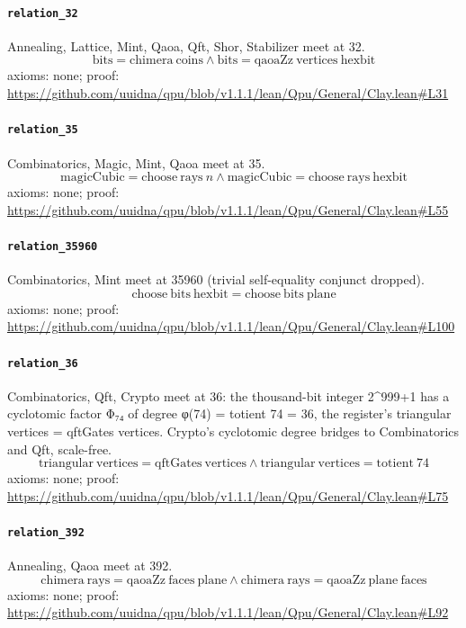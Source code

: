 \documentclass[11pt]{article}
\begin{document}
\paragraph{\texttt{relation\_32}}
Annealing, Lattice, Mint, Qaoa, Qft, Shor, Stabilizer meet at 32.
\[ \mathrm{bits} = \mathrm{chimera}\ \mathrm{coins} \land \mathrm{bits} = \mathrm{qaoaZz}\ \mathrm{vertices}\ \mathrm{hexbit} \]
\noindent axioms: none; proof: \url{https://github.com/uuidna/qpu/blob/v1.1.1/lean/Qpu/General/Clay.lean\#L31}

\paragraph{\texttt{relation\_35}}
Combinatorics, Magic, Mint, Qaoa meet at 35.
\[ \mathrm{magicCubic} = \mathrm{choose}\ \mathrm{rays}\ n \land \mathrm{magicCubic} = \mathrm{choose}\ \mathrm{rays}\ \mathrm{hexbit} \]
\noindent axioms: none; proof: \url{https://github.com/uuidna/qpu/blob/v1.1.1/lean/Qpu/General/Clay.lean\#L55}

\paragraph{\texttt{relation\_35960}}
Combinatorics, Mint meet at 35960 (trivial self-equality conjunct dropped).
\[ \mathrm{choose}\ \mathrm{bits}\ \mathrm{hexbit} = \mathrm{choose}\ \mathrm{bits}\ \mathrm{plane} \]
\noindent axioms: none; proof: \url{https://github.com/uuidna/qpu/blob/v1.1.1/lean/Qpu/General/Clay.lean\#L100}

\paragraph{\texttt{relation\_36}}
Combinatorics, Qft, Crypto meet at 36: the thousand-bit integer 2\^{}999+1 has a cyclotomic factor Φ₇₄ of degree φ(74) = totient 74 = 36, the register's triangular vertices = qftGates vertices. Crypto's cyclotomic degree bridges to Combinatorics and Qft, scale-free.
\[ \mathrm{triangular}\ \mathrm{vertices} = \mathrm{qftGates}\ \mathrm{vertices} \land \mathrm{triangular}\ \mathrm{vertices} = \mathrm{totient}\ 74 \]
\noindent axioms: none; proof: \url{https://github.com/uuidna/qpu/blob/v1.1.1/lean/Qpu/General/Clay.lean\#L75}

\paragraph{\texttt{relation\_392}}
Annealing, Qaoa meet at 392.
\[ \mathrm{chimera}\ \mathrm{rays} = \mathrm{qaoaZz}\ \mathrm{faces}\ \mathrm{plane} \land \mathrm{chimera}\ \mathrm{rays} = \mathrm{qaoaZz}\ \mathrm{plane}\ \mathrm{faces} \]
\noindent axioms: none; proof: \url{https://github.com/uuidna/qpu/blob/v1.1.1/lean/Qpu/General/Clay.lean\#L92}
\end{document}
